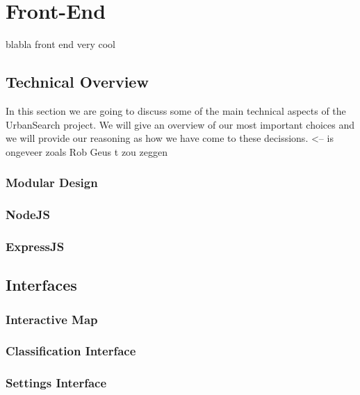\section{Front-End}
blabla front end very cool 
\subsection{Technical Overview}
In this section we are going to discuss some of the main technical aspects of the UrbanSearch project. We will give an overview of our most important choices and we will provide our reasoning as how we have come to these decissions. <-- is ongeveer zoals Rob Geus t zou zeggen

\subsubsection{Modular Design}
\subsubsection{NodeJS}
\subsubsection{ExpressJS}


\subsection{Interfaces}
\subsubsection{Interactive Map}
\subsubsection{Classification Interface}
\subsubsection{Settings Interface}